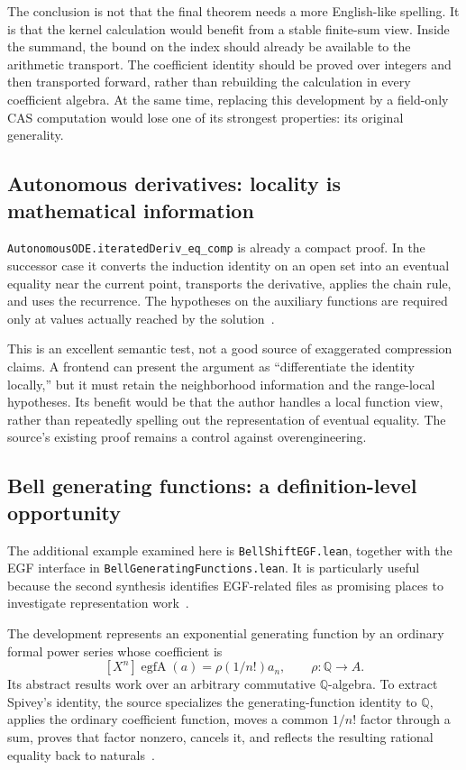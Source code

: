 \documentclass[11pt,a4paper]{article}
\newcommand{\code}[1]{\nolinkurl{#1}}
\newcommand{\Q}{\mathbb Q}
\theoremstyle{definition}
\begin{document}
The conclusion is not that the final theorem needs a more English-like spelling.
It is that the kernel calculation would benefit from a stable finite-sum view.
Inside the summand, the bound on the index should already be available to the
arithmetic transport. The coefficient identity should be proved over integers
and then transported forward, rather than rebuilding the calculation in every
coefficient algebra. At the same time, replacing this development by a
field-only CAS computation would lose one of its strongest properties: its
original generality.

\subsection{Autonomous derivatives: locality is mathematical information}
\code{AutonomousODE.iteratedDeriv_eq_comp} is already a compact proof. In the
successor case it converts the induction identity on an open set into an eventual
equality near the current point, transports the derivative, applies the chain
rule, and uses the recurrence. The hypotheses on the auxiliary functions are
required only at values actually reached by the solution~\cite{p-ode}.

This is an excellent semantic test, not a good source of exaggerated compression
claims. A frontend can present the argument as ``differentiate the identity
locally,'' but it must retain the neighborhood information and the range-local
hypotheses. Its benefit would be that the author handles a local function view,
rather than repeatedly spelling out the representation of eventual equality.
The source's existing proof remains a control against overengineering.

\subsection{Bell generating functions: a definition-level opportunity}
The additional example examined here is \code{BellShiftEGF.lean}, together with
the EGF interface in \code{BellGeneratingFunctions.lean}. It is particularly
useful because the second synthesis identifies EGF-related files as promising
places to investigate representation work~\cite{blueprints,p-bell,p-egf}.

The development represents an exponential generating function by an ordinary
formal power series whose coefficient is
\[
 [X^n]\operatorname{egfA}(a)=\rho(1/n!)a_n,
 \qquad \rho:\Q\longrightarrow A.
\]
Its abstract results work over an arbitrary commutative \(\Q\)-algebra. To extract
Spivey's identity, the source specializes the generating-function identity to
\(\Q\), applies the ordinary coefficient function, moves a common \(1/n!\) factor
through a sum, proves that factor nonzero, cancels it, and reflects the resulting
rational equality back to naturals~\cite{p-bell}.
\end{document}
